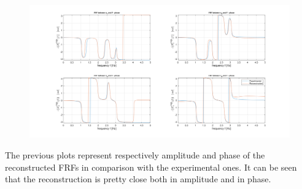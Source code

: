 \documentclass[a4paper,12pt,oneside]{article}
\begin{document}
\begin{figure}[H]
	\includegraphics[scale=0.3]{FRFrecoPHASE}
\end{figure}

The previous plots represent respectively amplitude and phase of the reconstructed FRFs in comparison with the experimental ones.
It can be seen that the reconstruction is pretty close both in amplitude and in phase.
\end{document}
